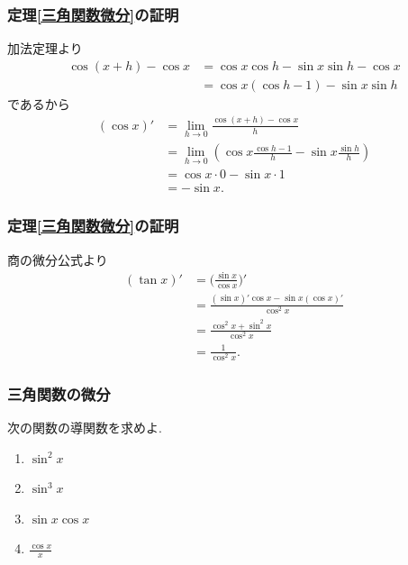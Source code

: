 \begin{frame}
\frametitle{定理\ref{三角関数微分}の証明}

加法定理より
\begin{align*} 
\cos(x +h)-\cos x & = \cos x \cos h - \sin x \sin h -\cos x \\
& =  \cos x (\cos h-1) - \sin x \sin h
\end{align*}
であるから
\begin{align*}
(\cos x)' &= \lim_{h \to 0} \frac{\cos(x +h)-\cos x}{h} \\
& =  \lim_{h \to 0} (\cos x \frac{\cos h-1}{h} - \sin x \frac{\sin h}{h}) \\
& =\cos x \cdot 0 - \sin x \cdot 1 \\
& = -\sin x. 
\end{align*}
\end{frame}




\begin{frame}
\frametitle{定理\ref{三角関数微分}の証明}

商の微分公式より
\begin{align*} 
(\tan x)' &= \Big( \frac{\sin x}{\cos x} \Big)' \\
&= \frac{(\sin x)'\cos x - \sin x (\cos x)'}{\cos^2 x} \\
&= \frac{\cos^2 x + \sin^2 x}{\cos^2 x} \\
&= \frac{1}{\cos^2 x}. 
\end{align*}

\end{frame}




\begin{frame}
\frametitle{三角関数の微分}

\begin{Prob}
次の関数の導関数を求めよ. 
\begin{enumerate}
\item $\sin^2 x$
\item $\sin^3 x$
\item $\sin x \cos x$
\item $\frac{\cos x}{x}$
\end{enumerate}
\end{Prob}

\end{frame}


